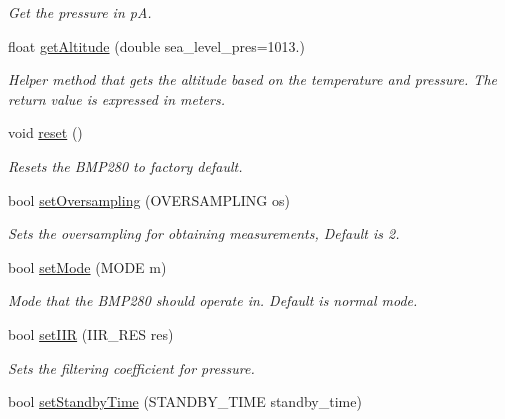 \begin{DoxyCompactItemize}
\begin{DoxyCompactList}\small\item\em Get the pressure in pA. \end{DoxyCompactList}\item 
float \mbox{\hyperlink{classbmp280lib__herkansing_abe01c7707407af7bcfaf6a04bf974aa8}{get\+Altitude}} (double sea\+\_\+level\+\_\+pres=1013.)
\begin{DoxyCompactList}\small\item\em Helper method that gets the altitude based on the temperature and pressure. The return value is expressed in meters. \end{DoxyCompactList}\item 
\mbox{\label{classbmp280lib__herkansing_a66f8a01172ff3d69fa3d0e9aedf459f3}} 
void \mbox{\hyperlink{classbmp280lib__herkansing_a66f8a01172ff3d69fa3d0e9aedf459f3}{reset}} ()
\begin{DoxyCompactList}\small\item\em Resets the B\+M\+P280 to factory default. \end{DoxyCompactList}\item 
bool \mbox{\hyperlink{classbmp280lib__herkansing_a7039106106dd5d76214ed6b8ee03fdca}{set\+Oversampling}} (O\+V\+E\+R\+S\+A\+M\+P\+L\+I\+NG os)
\begin{DoxyCompactList}\small\item\em Sets the oversampling for obtaining measurements, Default is 2. \end{DoxyCompactList}\item 
bool \mbox{\hyperlink{classbmp280lib__herkansing_a6c594dd38b45498ab69bf4489d77f7da}{set\+Mode}} (M\+O\+DE m)
\begin{DoxyCompactList}\small\item\em Mode that the B\+M\+P280 should operate in. Default is normal mode. \end{DoxyCompactList}\item 
bool \mbox{\hyperlink{classbmp280lib__herkansing_a61d6c72faa2af2fbd32294467a3cb9da}{set\+I\+IR}} (I\+I\+R\+\_\+\+R\+ES res)
\begin{DoxyCompactList}\small\item\em Sets the filtering coefficient for pressure. \end{DoxyCompactList}\item 
bool \mbox{\hyperlink{classbmp280lib__herkansing_aa538fdcce06539dd07b1733879518e1a}{set\+Standby\+Time}} (S\+T\+A\+N\+D\+B\+Y\+\_\+\+T\+I\+ME standby\+\_\+time)

\end{DoxyCompactItemize}
